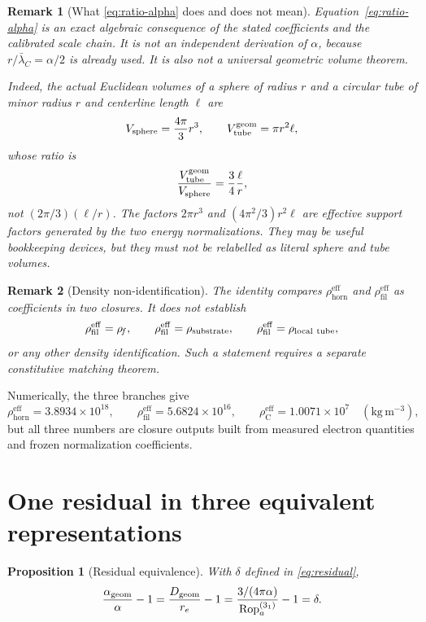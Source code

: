 \documentclass[aps,pre,preprint,notitlepage,nofootinbib,superscriptaddress]{revtex4-2}
\newcommand{\lC}{\bar\lambda_C}
\newcommand{\re}{r_e}
\newcommand{\Rop}{\operatorname{Rop}}
\newcommand{\rhohorn}{\rho_{\mathrm{horn}}^{\mathrm{eff}}}
\newcommand{\rhofil}{\rho_{\mathrm{fil}}^{\mathrm{eff}}}
\newcommand{\rhoCeff}{\rho_{\mathrm C}^{\mathrm{eff}}}
\newtheorem{proposition}{Proposition}
\newtheorem{remark}{Remark}
\begin{document}
\begin{remark}[What \cref{eq:ratio-alpha} does and does not mean]
Equation~\eqref{eq:ratio-alpha} is an exact algebraic consequence of the stated coefficients and the calibrated scale chain.  It is not an independent derivation of \(\alpha\), because \(r/\lC=\alpha/2\) is already used.  It is also not a universal geometric volume theorem.

Indeed, the actual Euclidean volumes of a sphere of radius \(r\) and a circular tube of minor radius \(r\) and centerline length \(\ell\) are
\[
V_{\rm sphere}=\frac{4\pi}{3}r^3,
\qquad
V_{\rm tube}^{\rm geom}=\pi r^2\ell,
\]
whose ratio is
\[
\frac{V_{\rm tube}^{\rm geom}}{V_{\rm sphere}}
=\frac34\frac{\ell}{r},
\]
not \((2\pi/3)(\ell/r)\).  The factors \(2\pi r^3\) and
\((4\pi^2/3)r^2\ell\) are effective support factors generated by the two energy normalizations.  They may be useful bookkeeping devices, but they must not be relabelled as literal sphere and tube volumes.
\end{remark}

\begin{remark}[Density non-identification]
The identity compares \(\rhohorn\) and \(\rhofil\) as coefficients in two closures.  It does not establish
\[
\rhofil=\rho_{\!f},
\qquad
\rhofil=\rho_{\rm substrate},
\qquad
\rhofil=\rho_{\rm local\ tube},
\]
or any other density identification.  Such a statement requires a separate constitutive matching theorem.
\end{remark}

Numerically, the three branches give
\begin{equation}
  \rhohorn=3.8934\times10^{18},
  \qquad
  \rhofil=5.6824\times10^{16},
  \qquad
  \rhoCeff=1.0071\times10^{7}
  \quad
  (\mathrm{kg\,m^{-3}}),
  \label{eq:numerical-coefficients}
\end{equation}
but all three numbers are closure outputs built from measured electron quantities and frozen normalization coefficients.

\section{One residual in three equivalent representations}
\label{sec:residual-three}

\begin{proposition}[Residual equivalence]
\label{prop:residual}
With \(\delta\) defined in \cref{eq:residual},
\begin{equation}
  \frac{\alpha_{\rm geom}}{\alpha}-1
  =
  \frac{D_{\rm geom}}{\re}-1
  =
  \frac{3/(4\pi\alpha)}{\Rop_a^{(3_1)}}-1
  =
  \delta.
  \label{eq:three-faces}
\end{equation}
\end{proposition}
\end{document}
